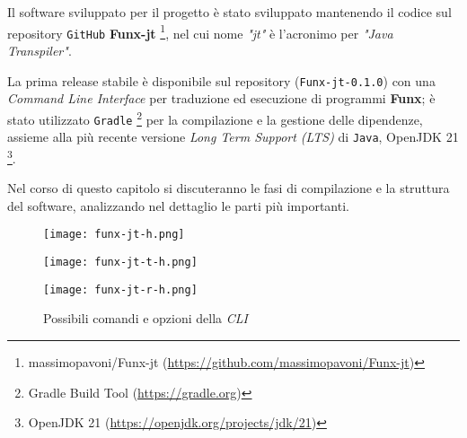 \chapter{}
\label{chap:5-compiler}

Il software sviluppato per il progetto è stato sviluppato mantenendo il codice sul repository \texttt{GitHub} \textbf{Funx-jt}%
\footnote{massimopavoni/Funx-jt (\url{https://github.com/massimopavoni/Funx-jt})},
nel cui nome \textit{"jt"} è l'acronimo per \textit{"Java Transpiler"}.

\noindent La prima release stabile è disponibile sul repository (\texttt{Funx-jt-0.1.0})
con una \textit{Command Line Interface} per traduzione ed esecuzione di programmi \textbf{Funx};
è stato utilizzato \texttt{Gradle}%
\footnote{Gradle Build Tool (\url{https://gradle.org})}
per la compilazione e la gestione delle dipendenze,
assieme alla più recente versione \textit{Long Term Support (LTS)} di \texttt{Java}, OpenJDK 21%
\footnote{OpenJDK 21 (\url{https://openjdk.org/projects/jdk/21})}.

Nel corso di questo capitolo si discuteranno le fasi di compilazione e la struttura del software,
analizzando nel dettaglio le parti più importanti.

\begin{figure}
    \vspace{4mm}
    \begin{minipage}{0.85\textwidth}
        \texttt{[image: funx-jt-h.png]}
        \vspace{2mm}
    \end{minipage}
    \begin{minipage}{0.85\textwidth}
        \texttt{[image: funx-jt-t-h.png]}
        \vspace{2mm}
    \end{minipage}
    \begin{minipage}{0.85\textwidth}
        \texttt{[image: funx-jt-r-h.png]}
    \end{minipage}
    \caption{Possibili comandi e opzioni della \textit{CLI}}
    \label{fig:5-compiler-cli}
\end{figure}

\newpage





\newpage



